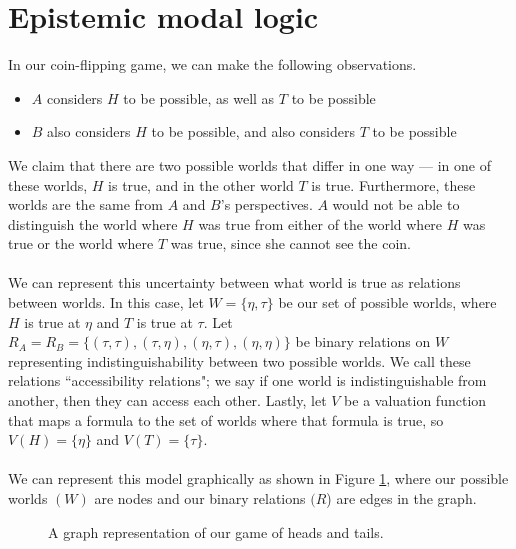 \section{Epistemic modal logic}\label{survey_epistemic_modal_logic}
In our coin-flipping game, we can make the following observations.
\begin{itemize}
	\item $A$ considers $H$ to be possible, as well as $T$ to be possible
	\item $B$ also considers $H$ to be possible, and also considers $T$ to be possible
\end{itemize}
We claim that there are two possible worlds that differ in one way ---
in one of these worlds, $H$ is true, and in the other world $T$ is true.
Furthermore, these worlds are the same from $A$ and $B$'s perspectives.
$A$ would not be able to distinguish the world where $H$ was true from either of
the world where $H$ was true or the world where $T$ was true, since she cannot
see the coin.\\
\\
We can represent this uncertainty between what world is true as relations
between worlds.
In this case, let $W = \{ \eta, \tau\}$ be our set of possible worlds, where $H$ is true
at $\eta$ and $T$ is true at $\tau$.
Let $R_A = R_B = \{(\tau,\tau), (\tau,\eta), (\eta, \tau), (\eta,\eta)\}$ be
binary relations on $W$ representing indistinguishability between two possible
worlds.
We call these relations ``accessibility relations"; we say if one world is
indistinguishable from another, then they can access each other.
Lastly, let $V$ be a valuation function that maps a formula to the set of worlds
where that formula is true, so $V(H) = \{\eta\}$ and $V(T) = \{\tau\}$.\\
\\
We can represent this model graphically as shown in Figure \ref{htkripkefigure},
where our possible worlds $(W)$ are nodes and our binary relations $(R$) are edges in the
graph.

\begin{figure}[ht!]
\centering
{}
\caption[Possible worlds game of heads and tails.]{A graph representation of our game of heads and tails.}\label{htkripkefigure}
\end{figure}

